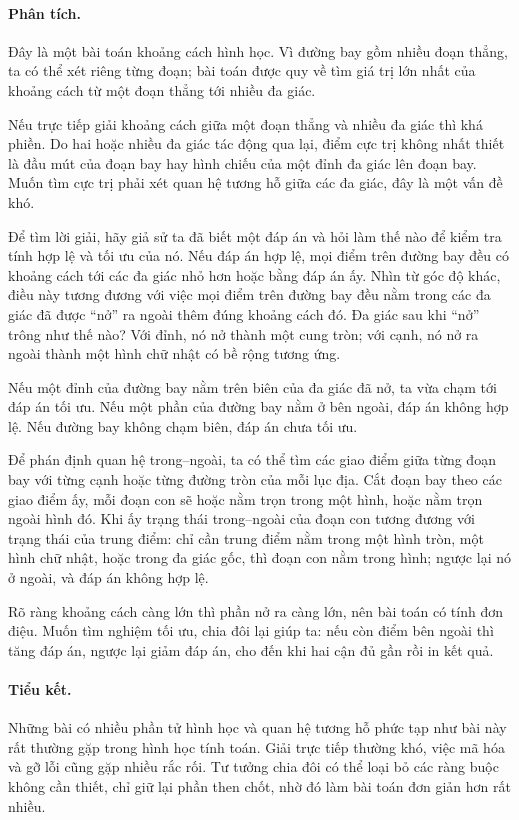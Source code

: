 \documentclass[11pt]{article}
\begin{document}
\paragraph{Phân tích.}
Đây là một bài toán khoảng cách hình học. Vì đường bay gồm nhiều đoạn thẳng,
ta có thể xét riêng từng đoạn; bài toán được quy về tìm giá trị lớn nhất của
khoảng cách từ một đoạn thẳng tới nhiều đa giác.

Nếu trực tiếp giải khoảng cách giữa một đoạn thẳng và nhiều đa giác thì khá
phiền. Do hai hoặc nhiều đa giác tác động qua lại, điểm cực trị không nhất
thiết là đầu mút của đoạn bay hay hình chiếu của một đỉnh đa giác lên đoạn
bay. Muốn tìm cực trị phải xét quan hệ tương hỗ giữa các đa giác, đây là một
vấn đề khó.

Để tìm lời giải, hãy giả sử ta đã biết một đáp án và hỏi làm thế nào để kiểm
tra tính hợp lệ và tối ưu của nó. Nếu đáp án hợp lệ, mọi điểm trên đường bay
đều có khoảng cách tới các đa giác nhỏ hơn hoặc bằng đáp án ấy. Nhìn từ góc
độ khác, điều này tương đương với việc mọi điểm trên đường bay đều nằm trong
các đa giác đã được ``nở'' ra ngoài thêm đúng khoảng cách đó. Đa giác sau khi
``nở'' trông như thế nào? Với đỉnh, nó nở thành một cung tròn; với cạnh, nó
nở ra ngoài thành một hình chữ nhật có bề rộng tương ứng.

Nếu một đỉnh của đường bay nằm trên biên của đa giác đã nở, ta vừa chạm tới
đáp án tối ưu. Nếu một phần của đường bay nằm ở bên ngoài, đáp án không hợp
lệ. Nếu đường bay không chạm biên, đáp án chưa tối ưu.

Để phán định quan hệ trong--ngoài, ta có thể tìm các giao điểm giữa từng đoạn
bay với từng cạnh hoặc từng đường tròn của mỗi lục địa. Cắt đoạn bay theo các
giao điểm ấy, mỗi đoạn con sẽ hoặc nằm trọn trong một hình, hoặc nằm trọn
ngoài hình đó. Khi ấy trạng thái trong--ngoài của đoạn con tương đương với
trạng thái của trung điểm: chỉ cần trung điểm nằm trong một hình tròn, một
hình chữ nhật, hoặc trong đa giác gốc, thì đoạn con nằm trong hình; ngược lại
nó ở ngoài, và đáp án không hợp lệ.

Rõ ràng khoảng cách càng lớn thì phần nở ra càng lớn, nên bài toán có tính
đơn điệu. Muốn tìm nghiệm tối ưu, chia đôi lại giúp ta: nếu còn điểm bên
ngoài thì tăng đáp án, ngược lại giảm đáp án, cho đến khi hai cận đủ gần rồi
in kết quả.

\paragraph{Tiểu kết.}
Những bài có nhiều phần tử hình học và quan hệ tương hỗ phức tạp như bài này
rất thường gặp trong hình học tính toán. Giải trực tiếp thường khó, việc mã
hóa và gỡ lỗi cũng gặp nhiều rắc rối. Tư tưởng chia đôi có thể loại bỏ các
ràng buộc không cần thiết, chỉ giữ lại phần then chốt, nhờ đó làm bài toán
đơn giản hơn rất nhiều.
\end{document}
